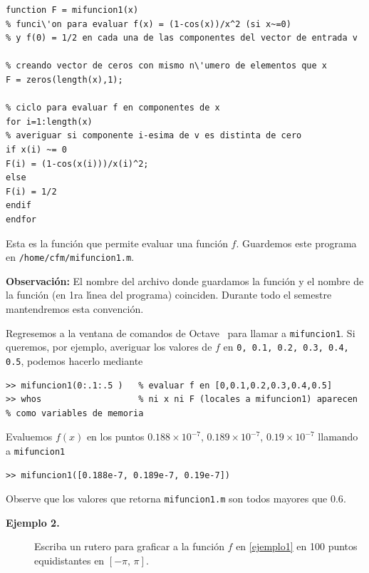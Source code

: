 \documentclass[letter,11pt]{article}
\newcommand\0{\mathbf{0}}
\newcommand{\octave}{{\sc Octave }}
\begin{document}
    \medskip

\begin{lstlisting}		
function F = mifuncion1(x)
% funci\'on para evaluar f(x) = (1-cos(x))/x^2 (si x~=0) 
% y f(0) = 1/2 en cada una de las componentes del vector de entrada v

% creando vector de ceros con mismo n\'umero de elementos que x
F = zeros(length(x),1);

% ciclo para evaluar f en componentes de x
for i=1:length(x)
% averiguar si componente i-esima de v es distinta de cero
if x(i) ~= 0
F(i) = (1-cos(x(i)))/x(i)^2;
else
F(i) = 1/2
endif
endfor
\end{lstlisting}

\medskip

Esta es la funci\'on que permite evaluar una funci\'on $f$.	Guardemos este programa en \Verb+/home/cfm/mifuncion1.m+.
\smallskip

{\bf Observaci\'on:} El nombre del archivo donde guardamos la funci\'on
y el nombre de la funci\'on (en 1ra l\'{\i}nea del programa) coinciden.
Durante todo el semestre mantendremos esta convenci\'on.	

\smallskip

Regresemos a la ventana de comandos de \octave\, para llamar a \Verb+mifuncion1+.
Si queremos, por ejemplo, averiguar los valores de $f$ en \verb"0, 0.1, 0.2, 0.3, 0.4, 0.5", podemos hacerlo mediante

\medskip

\begin{lstlisting}
>> mifuncion1(0:.1:.5 )   % evaluar f en [0,0.1,0.2,0.3,0.4,0.5]
>> whos                   % ni x ni F (locales a mifuncion1) aparecen
% como variables de memoria
\end{lstlisting}

\medskip

Evaluemos $f(x)$ en los puntos $0.188 \times 10^{-7}$, $0.189\times 10^{-7}$, $0.19\times 10^{-7}$
llamando a \Verb+mifuncion1+

\medskip

\begin{lstlisting}		
>> mifuncion1([0.188e-7, 0.189e-7, 0.19e-7])
\end{lstlisting}

\medskip

Observe que los valores que retorna \Verb+mifuncion1.m+ son todos mayores que
$0.6$.

\begin{description}
\item[\textbf{Ejemplo 2.}] Escriba un rutero para graficar a la funci\'on $f$ en \eqref{ejemplo1}
en 100 puntos equidistantes en $[-\pi,\,\pi]$.
\end{description}
\end{document}
